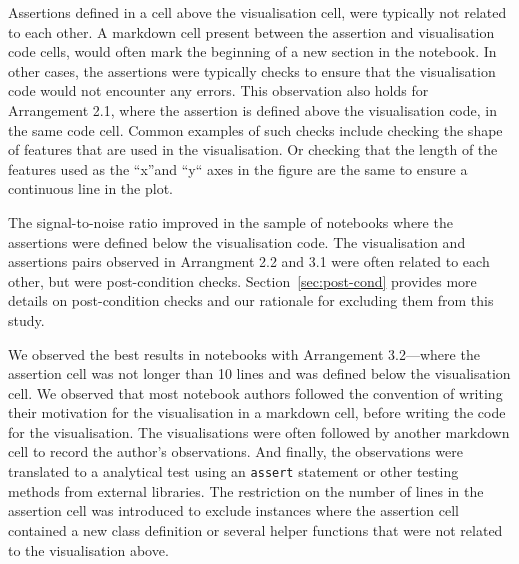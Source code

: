 \documentclass[conference]{IEEEtran}
\begin{document}
Assertions defined in a cell above the visualisation cell, were typically not related to each other. A markdown cell present between the assertion and visualisation code cells, would often mark the beginning of a new section in the notebook. In other cases, the assertions were typically checks to ensure that the visualisation code would not encounter any errors. This observation also holds for Arrangement 2.1, where the assertion is defined above the visualisation code, in the same code cell. Common examples of such checks include checking the shape of features that are used in the visualisation. Or checking that the length of the features used as the ``x''and ``y`` axes in the figure are the same to ensure a continuous line in the plot.

The signal-to-noise ratio improved in the sample of notebooks where the assertions were defined below the visualisation code. The visualisation and assertions pairs observed in Arrangment 2.2 and 3.1 were often related to each other, but were post-condition checks. Section~\ref{sec:post-cond} provides more details on post-condition checks and our rationale for excluding them from this study.

We observed the best results in notebooks with Arrangement 3.2---where the assertion cell was not longer than 10 lines and was defined below the visualisation cell. We observed that most notebook authors followed the convention of writing their motivation for the visualisation in a markdown cell, before writing the code for the visualisation. The visualisations were often followed by another markdown cell to record the author's observations. And finally, the observations were translated to a analytical test using an \texttt{assert} statement or other testing methods from external libraries. The restriction on the number of lines in the assertion cell was introduced to exclude instances where the assertion cell contained a new class definition or several helper functions that were not related to the visualisation above.
\end{document}

